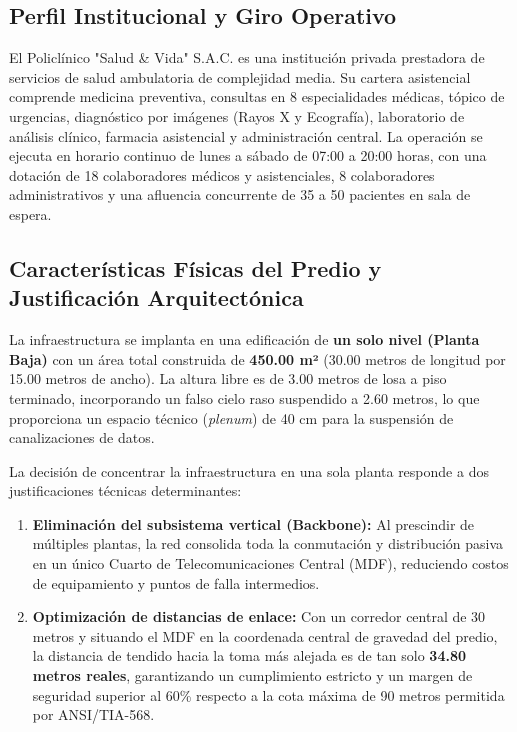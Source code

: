 \documentclass[11pt,a4paper]{article}
\begin{document}
\subsection{Perfil Institucional y Giro Operativo}
El Policlínico "Salud \& Vida" S.A.C. es una institución privada prestadora de servicios de salud ambulatoria de complejidad media. Su cartera asistencial comprende medicina preventiva, consultas en 8 especialidades médicas, tópico de urgencias, diagnóstico por imágenes (Rayos X y Ecografía), laboratorio de análisis clínico, farmacia asistencial y administración central. La operación se ejecuta en horario continuo de lunes a sábado de 07:00 a 20:00 horas, con una dotación de 18 colaboradores médicos y asistenciales, 8 colaboradores administrativos y una afluencia concurrente de 35 a 50 pacientes en sala de espera.

\subsection{Características Físicas del Predio y Justificación Arquitectónica}
La infraestructura se implanta en una edificación de \textbf{un solo nivel (Planta Baja)} con un área total construida de \textbf{450.00 m²} (30.00 metros de longitud por 15.00 metros de ancho). La altura libre es de 3.00 metros de losa a piso terminado, incorporando un falso cielo raso suspendido a 2.60 metros, lo que proporciona un espacio técnico (\textit{plenum}) de 40 cm para la suspensión de canalizaciones de datos.

La decisión de concentrar la infraestructura en una sola planta responde a dos justificaciones técnicas determinantes:
\begin{enumerate}[noitemsep]
    \item \textbf{Eliminación del subsistema vertical (Backbone):} Al prescindir de múltiples plantas, la red consolida toda la conmutación y distribución pasiva en un único Cuarto de Telecomunicaciones Central (MDF), reduciendo costos de equipamiento y puntos de falla intermedios.
    \item \textbf{Optimización de distancias de enlace:} Con un corredor central de 30 metros y situando el MDF en la coordenada central de gravedad del predio, la distancia de tendido hacia la toma más alejada es de tan solo \textbf{34.80 metros reales}, garantizando un cumplimiento estricto y un margen de seguridad superior al 60\% respecto a la cota máxima de 90 metros permitida por ANSI/TIA-568.
\end{enumerate}
\end{document}
